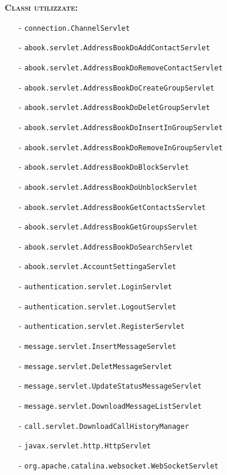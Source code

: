 \begin{description}
	\item{\scshape\bfseries Classi utilizzate:}\\
	\begin{itemize}[noitemsep,nolistsep]
	  \item[-] \texttt{connection.ChannelServlet}
	  \item[-] \texttt{abook.servlet.AddressBookDoAddContactServlet}
	  \item[-] \texttt{abook.servlet.AddressBookDoRemoveContactServlet}
	  \item[-] \texttt{abook.servlet.AddressBookDoCreateGroupServlet}
	  \item[-] \texttt{abook.servlet.AddressBookDoDeletGroupServlet}
	  \item[-] \texttt{abook.servlet.AddressBookDoInsertInGroupServlet}
	  \item[-] \texttt{abook.servlet.AddressBookDoRemoveInGroupServlet}
	  \item[-] \texttt{abook.servlet.AddressBookDoBlockServlet}
	  \item[-] \texttt{abook.servlet.AddressBookDoUnblockServlet}
	  \item[-] \texttt{abook.servlet.AddressBookGetContactsServlet}
	  \item[-] \texttt{abook.servlet.AddressBookGetGroupsServlet}
	  \item[-] \texttt{abook.servlet.AddressBookDoSearchServlet}
	\item[-] \texttt{abook.servlet.AccountSettingaServlet}	  
	  \item[-] \texttt{authentication.servlet.LoginServlet}
	  \item[-] \texttt{authentication.servlet.LogoutServlet}
	  \item[-] \texttt{authentication.servlet.RegisterServlet}
	  \item[-] \texttt{message.servlet.InsertMessageServlet}
	  \item[-] \texttt{message.servlet.DeletMessageServlet}
	  \item[-] \texttt{message.servlet.UpdateStatusMessageServlet}
	  \item[-] \texttt{message.servlet.DownloadMessageListServlet}
	  \item[-] \texttt{call.servlet.DownloadCallHistoryManager}
	  \item[-] \texttt{javax.servlet.http.HttpServlet}
	  \item[-] \texttt{org.apache.catalina.websocket.WebSocketServlet}
	\end{itemize}
\end{description}


